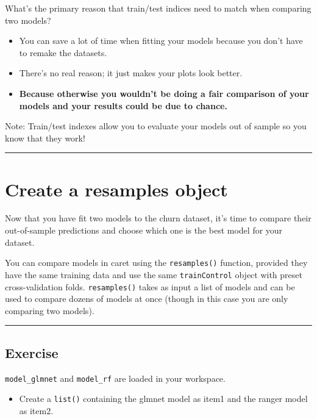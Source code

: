 \documentclass[]{book}
\providecommand{\tightlist}{%
  \setlength{\itemsep}{0pt}\setlength{\parskip}{0pt}}
\begin{document}
What's the primary reason that train/test indices need to match when
comparing two models?

\begin{itemize}
\item
  You can save a lot of time when fitting your models because you don't
  have to remake the datasets.
\item
  There's no real reason; it just makes your plots look better.
\item
  \textbf{Because otherwise you wouldn't be doing a fair comparison of
  your models and your results could be due to chance.}
\end{itemize}

Note: Train/test indexes allow you to evaluate your models out of sample
so you know that they work!

\begin{center}\rule{0.5\linewidth}{\linethickness}\end{center}

\section{Create a resamples object}\label{create-a-resamples-object}

Now that you have fit two models to the churn dataset, it's time to
compare their out-of-sample predictions and choose which one is the best
model for your dataset.

You can compare models in caret using the \texttt{resamples()} function,
provided they have the same training data and use the same
\texttt{trainControl} object with preset cross-validation folds.
\texttt{resamples()} takes as input a list of models and can be used to
compare dozens of models at once (though in this case you are only
comparing two models).

\begin{center}\rule{0.5\linewidth}{\linethickness}\end{center}

\subsection*{Exercise}\label{exercise-32}

\texttt{model\_glmnet} and \texttt{model\_rf} are loaded in your
workspace.

\begin{itemize}
\tightlist
\item
  Create a \texttt{list()} containing the glmnet model as item1 and the
  ranger model as item2.
\end{itemize}
\end{document}
